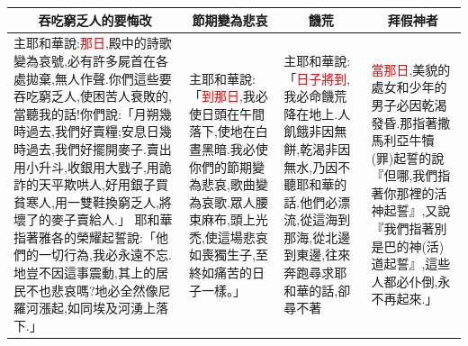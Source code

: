 \begin{table}[H]
\centering
\begin{tabular}{p{21.45em}|p{8.47em}|p{8.4700em}|p{9.00em}}\hline\hline
\multicolumn{1}{c|}{吞吃窮乏人的要悔改}&\multicolumn{1}{c|}{節期變為悲哀}&\multicolumn{1}{c|}{饑荒}&\multicolumn{1}{c}{拜假神者}\\\hline
主耶和華說:\textcolor{red}{那日},殿中的詩歌變為哀號,必有許多屍首在各處拋棄,無人作聲.你們這些要吞吃窮乏人,使困苦人衰敗的,當聽我的話!你們說:「月朔幾時過去,我們好賣糧;安息日幾時過去,我們好擺開麥子.賣出用小升斗,收銀用大戥子,用詭詐的天平欺哄人,好用銀子買貧寒人,用一雙鞋換窮乏人,將壞了的麥子賣給人.」 耶和華指著雅各的榮耀起誓說:「他們的一切行為,我必永遠不忘.地豈不因這事震動,其上的居民不也悲哀嗎?地必全然像尼羅河漲起,如同埃及河湧上落下.」 
&主耶和華說:「\textcolor{red}{到那日},我必使日頭在午間落下,使地在白晝黑暗.我必使你們的節期變為悲哀,歌曲變為哀歌.眾人腰束麻布,頭上光禿,使這場悲哀如喪獨生子,至終如痛苦的日子一樣。」
&主耶和華說:「\textcolor{red}{日子將到},我必命饑荒降在地上.人飢餓非因無餅,乾渴非因無水,乃因不聽耶和華的話.他們必漂流,從這海到那海,從北邊到東邊,往來奔跑尋求耶和華的話,卻尋不著
&\textcolor{red}{當那日},美貌的處女和少年的男子必因乾渴發昏.那指著撒馬利亞牛犢(罪)起誓的說『但哪,我們指著你那裡的活神起誓』,又說『我們指著別是巴的神(活)道起誓』,這些人都必仆倒,永不再起來.」\\\hline
\end{tabular}
\end{table} 


